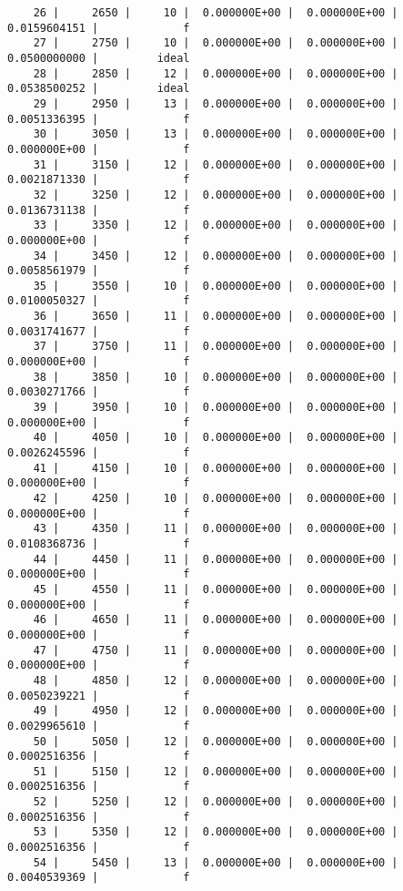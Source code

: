 \documentclass[
  letterpaper,
  DIV=11,
  numbers=noendperiod]{scrartcl}
\begin{document}
\begin{verbatim}
    26 |     2650 |     10 |  0.000000E+00 |  0.000000E+00 |  0.0159604151 |             f
    27 |     2750 |     10 |  0.000000E+00 |  0.000000E+00 |  0.0500000000 |         ideal
    28 |     2850 |     12 |  0.000000E+00 |  0.000000E+00 |  0.0538500252 |         ideal
    29 |     2950 |     13 |  0.000000E+00 |  0.000000E+00 |  0.0051336395 |             f
    30 |     3050 |     13 |  0.000000E+00 |  0.000000E+00 |  0.000000E+00 |             f
    31 |     3150 |     12 |  0.000000E+00 |  0.000000E+00 |  0.0021871330 |             f
    32 |     3250 |     12 |  0.000000E+00 |  0.000000E+00 |  0.0136731138 |             f
    33 |     3350 |     12 |  0.000000E+00 |  0.000000E+00 |  0.000000E+00 |             f
    34 |     3450 |     12 |  0.000000E+00 |  0.000000E+00 |  0.0058561979 |             f
    35 |     3550 |     10 |  0.000000E+00 |  0.000000E+00 |  0.0100050327 |             f
    36 |     3650 |     11 |  0.000000E+00 |  0.000000E+00 |  0.0031741677 |             f
    37 |     3750 |     11 |  0.000000E+00 |  0.000000E+00 |  0.000000E+00 |             f
    38 |     3850 |     10 |  0.000000E+00 |  0.000000E+00 |  0.0030271766 |             f
    39 |     3950 |     10 |  0.000000E+00 |  0.000000E+00 |  0.000000E+00 |             f
    40 |     4050 |     10 |  0.000000E+00 |  0.000000E+00 |  0.0026245596 |             f
    41 |     4150 |     10 |  0.000000E+00 |  0.000000E+00 |  0.000000E+00 |             f
    42 |     4250 |     10 |  0.000000E+00 |  0.000000E+00 |  0.000000E+00 |             f
    43 |     4350 |     11 |  0.000000E+00 |  0.000000E+00 |  0.0108368736 |             f
    44 |     4450 |     11 |  0.000000E+00 |  0.000000E+00 |  0.000000E+00 |             f
    45 |     4550 |     11 |  0.000000E+00 |  0.000000E+00 |  0.000000E+00 |             f
    46 |     4650 |     11 |  0.000000E+00 |  0.000000E+00 |  0.000000E+00 |             f
    47 |     4750 |     11 |  0.000000E+00 |  0.000000E+00 |  0.000000E+00 |             f
    48 |     4850 |     12 |  0.000000E+00 |  0.000000E+00 |  0.0050239221 |             f
    49 |     4950 |     12 |  0.000000E+00 |  0.000000E+00 |  0.0029965610 |             f
    50 |     5050 |     12 |  0.000000E+00 |  0.000000E+00 |  0.0002516356 |             f
    51 |     5150 |     12 |  0.000000E+00 |  0.000000E+00 |  0.0002516356 |             f
    52 |     5250 |     12 |  0.000000E+00 |  0.000000E+00 |  0.0002516356 |             f
    53 |     5350 |     12 |  0.000000E+00 |  0.000000E+00 |  0.0002516356 |             f
    54 |     5450 |     13 |  0.000000E+00 |  0.000000E+00 |  0.0040539369 |             f

\end{verbatim}
\end{document}

